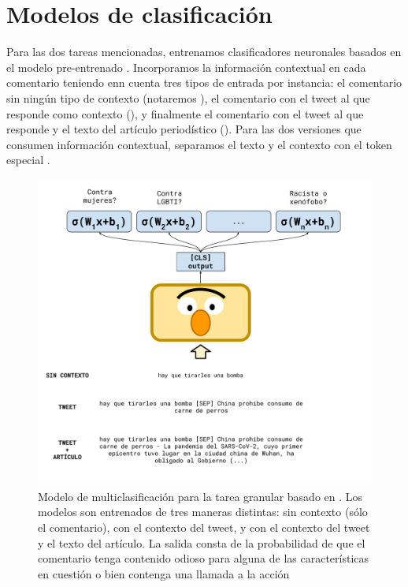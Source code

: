 \section{Modelos de clasificación}
\label{sec:contextualized_classifiers}


Para las dos tareas mencionadas, entrenamos clasificadores neuronales basados en el modelo pre-entrenado \beto{} \cite{canete2020spanish}. Incorporamos la información contextual en cada comentario teniendo enn cuenta tres tipos de entrada por instancia: el comentario sin ningún tipo de contexto (notaremos ), el comentario con el tweet al que responde como contexto (), y finalmente el comentario con el tweet al que responde y el texto del artículo periodístico (). Para las dos versiones que consumen información contextual, separamos el texto y el contexto con el token especial \septok{}.


\begin{figure}
    \centering
    \includegraphics[width=1.10\textwidth]{img/06/bert_contextual_classifier.pdf}
    \caption{Modelo de multiclasificación para la tarea granular basado en \beto{}. Los modelos son entrenados de tres maneras distintas: sin contexto (sólo el comentario), con el contexto del tweet, y con el contexto del tweet y el texto del artículo. La salida consta de la probabilidad de que el comentario tenga contenido odioso para alguna de las características en cuestión o bien contenga una llamada a la acción}
    \label{fig:05_multi_bert_classifier}
\end{figure}

